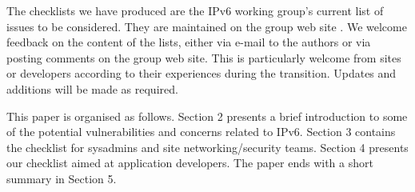 The checklists we have produced are the IPv6 working group's current list of issues to be considered. They are maintained on the group web site \cite {ipv6wg}. We welcome feedback on the content of the lists, either via e-mail to the authors or via posting comments on the group web site. This is particularly welcome from sites or developers  according to their experiences during the transition. Updates and additions will be made as required.

This paper is organised as follows. Section 2 presents a brief introduction to some of the potential vulnerabilities and concerns related to IPv6. Section 3 contains the checklist for sysadmins and site networking/security teams. Section 4 presents our checklist aimed at application developers. The paper ends with a short summary in Section 5.





